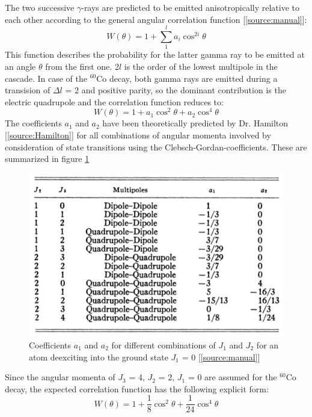 \documentclass[a4paper,parskip,11pt, DIV12]{scrreprt}
\begin{document}
		The two successive $\gamma$-rays are predicted to be emitted anisotropically relative to each other according to the general angular correlation function [\ref{source:manual}]:
		\begin{equation}
		W(\theta) = 1 + \sum^l_1 a_i \cos ^{2i} \theta
		\end{equation}	
		This function describes the probability for the latter gamma ray to be emitted at an angle $\theta$ from the first one. 2$l$ is the order of the lowest multipole in the cascade. In case of the $^{60}$Co decay, both gamma rays are emitted during a transision of $\Delta l$ = 2 and positive parity, so the dominant contribution is the electric quadrupole and the correlation function reduces to:	
		\begin{equation} \label{eq:Ang1}
		W(\theta) = 1 + a_1 \cos ^{2} \theta +  a_2 \cos ^{4} \theta
		\end{equation}		
		The coefficients $a_1$ and $a_2$ have been theoretically predicted by Dr. Hamilton [\ref{source:Hamilton}] for all combinations of angular momenta involved by consideration of state transitions using the Clebsch-Gordan-coefficients. These are summarized in figure \ref{fig:coefficients}		
		\begin{figure}[H]
\centering
\includegraphics[scale=0.4]{Coefficients.png}
\caption[Coefficients]{Coefficients $a_1$ and $a_2$ for different combinations of $J_1$ and $J_2$ for an atom deexciting into the ground state $J_1$ = 0 [\ref{source:manual}]}
\label{fig:coefficients}
		\end{figure}		
		Since the angular momenta of $J_3$ = 4, $J_2$ = 2, $J_1$ = 0 are assumed for the $^{60}$Co decay, the expected correlation function has the following explicit form:		
		\begin{equation} \label{eq:AngularCorrelation}
		W(\theta) = 1 + \frac{1}{8} \cos ^{2} \theta +  \frac{1}{24} \cos ^{4} \theta
		\end{equation} 
		
\end{document}
